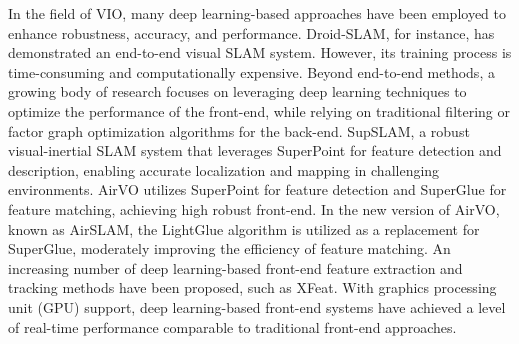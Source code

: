 In the field of VIO, many deep learning-based approaches have been employed to enhance robustness, accuracy, and performance. Droid-SLAM\cite{Droidslam}, for instance, has demonstrated an end-to-end visual SLAM system. However, its training process is time-consuming and computationally expensive. Beyond end-to-end methods, a growing body of research focuses on leveraging deep learning techniques to optimize the performance of the front-end, while relying on traditional filtering or factor graph optimization algorithms for the back-end. SupSLAM\cite{supslam}, a robust visual-inertial SLAM system that leverages SuperPoint\cite{superpoint} for feature detection and description, enabling accurate localization and mapping in challenging environments. AirVO\cite{airslam} utilizes SuperPoint for feature detection and SuperGlue\cite{superglue} for feature matching, achieving high robust front-end. In the new version of AirVO, known as AirSLAM, the LightGlue\cite{lightglue} algorithm is utilized as a replacement for SuperGlue, moderately improving the efficiency of feature matching. An increasing number of deep learning-based front-end feature extraction and tracking methods have been proposed, such as XFeat\cite{Xfeat}. With graphics processing unit (GPU) support, deep learning-based front-end systems have achieved a level of real-time performance comparable to traditional front-end approaches\cite{airslam,Xfeat}.%